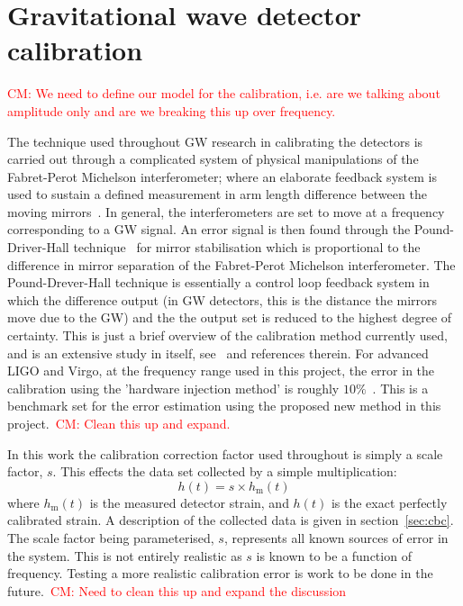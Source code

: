 \documentclass[12pt]{iopart}
\newcommand{\cm}[1]{\textcolor{red}{CM: #1}}
\begin{document}
\section{Gravitational wave detector calibration\label{sec:calibration}}

\cm{We need to define our model for the calibration, i.e. are we talking
about amplitude only and are we breaking this up over frequency.}

The technique used throughout GW research in calibrating the detectors is
carried out through a complicated system of physical manipulations of the
Fabret-Perot Michelson interferometer; where an elaborate feedback system is
used to sustain a defined measurement in arm length difference between the
moving mirrors~\cite{LIGOCal}. In general, the interferometers are set to move
at a frequency corresponding to a GW signal. An error signal is then found
through the Pound-Driver-Hall technique~\cite{Black} for mirror stabilisation
which is proportional to the difference in mirror separation of the
Fabret-Perot Michelson interferometer. The Pound-Drever-Hall technique is
essentially a control loop feedback system in which the difference output (in
GW detectors, this is the distance the mirrors move due to the GW) and the the
output set is reduced to the highest degree of certainty. This is just a brief
overview of the calibration method currently used, and is an extensive study in
itself, see~\cite{Vitale} and references therein. For advanced LIGO and Virgo,
at the frequency range used in this project, the error in the calibration using
the 'hardware injection method' is roughly $10\%$~\cite{Vitale}. This is a
benchmark set for the error estimation using the proposed new method in this
project.~\cm{Clean this up and expand.}

In this work the calibration correction factor used throughout is simply a scale
factor, $s$. This effects the data set collected by a simple multiplication:
%
\begin{equation}\label{eq:scaledata}
  h(t) = s\times h_{\mathrm{m}}(t)
\end{equation}
%
where $h_{\mathrm{m}}(t)$ is the measured detector strain, and
$h(t)$ is the exact perfectly calibrated strain. A description of the
collected data is given in section~\ref{sec:cbc}. The scale factor being
parameterised, $s$, represents all known sources of error in the system. This
is not entirely realistic as $s$ is known to be a function of frequency.
Testing a more realistic calibration error is work to be done in the
future.~\cm{Need to clean this up and expand the discussion}
\end{document}
